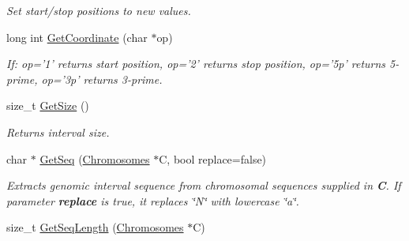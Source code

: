 \begin{CompactItemize}
\begin{CompactList}\small\item\em Set start/stop positions to new values. \item\end{CompactList}\item 
\hypertarget{classGenomicInterval_e068e54e894fb239b61ec6d29e5f70bf}{
long int \hyperlink{classGenomicInterval_e068e54e894fb239b61ec6d29e5f70bf}{GetCoordinate} (char $\ast$op)}
\label{classGenomicInterval_e068e54e894fb239b61ec6d29e5f70bf}

\begin{CompactList}\small\item\em If: op='1' returns start position, op='2' returns stop position, op='5p' returns 5-prime, op='3p' returns 3-prime. \item\end{CompactList}\item 
\hypertarget{classGenomicInterval_7ceb36d952453db9473c7548c885f40a}{
size\_\-t \hyperlink{classGenomicInterval_7ceb36d952453db9473c7548c885f40a}{GetSize} ()}
\label{classGenomicInterval_7ceb36d952453db9473c7548c885f40a}

\begin{CompactList}\small\item\em Returns interval size. \item\end{CompactList}\item 
\hypertarget{classGenomicInterval_ff25b35226220508539b1183d5b9c11d}{
char $\ast$ \hyperlink{classGenomicInterval_ff25b35226220508539b1183d5b9c11d}{GetSeq} (\hyperlink{classChromosomes}{Chromosomes} $\ast$C, bool replace=false)}
\label{classGenomicInterval_ff25b35226220508539b1183d5b9c11d}

\begin{CompactList}\small\item\em Extracts genomic interval sequence from chromosomal sequences supplied in {\bf C}. If parameter {\bf replace} is true, it replaces \char`\"{}N\char`\"{} with lowercase \char`\"{}a\char`\"{}. \item\end{CompactList}\item 
\hypertarget{classGenomicInterval_39cd65d08a0c64a8bbddec32c8decbd3}{
size\_\-t \hyperlink{classGenomicInterval_39cd65d08a0c64a8bbddec32c8decbd3}{GetSeqLength} (\hyperlink{classChromosomes}{Chromosomes} $\ast$C)}
\label{classGenomicInterval_39cd65d08a0c64a8bbddec32c8decbd3}


\end{CompactItemize}
